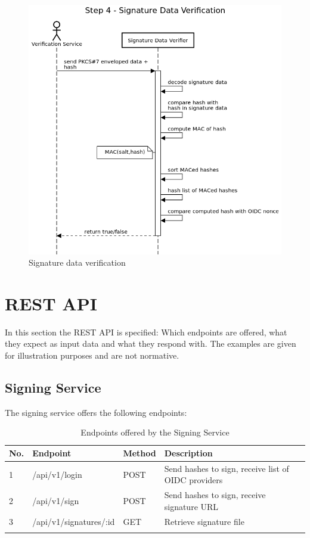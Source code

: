 \begin{figure}
    \begin{center}
        \includegraphics[scale=0.5]{images/protocol_verification_step4_signature_data.png}
        \caption{Signature data verification}
        \label{fig:signaturedataverification}
    \end{center}
\end{figure}

\section{REST API}\label{sec:rest-api}
In this section the \gls{REST} \gls{API} is specified:
Which endpoints are offered, what they expect as input data and what they respond with.
The examples are given for illustration purposes and are not normative.

\subsection{Signing Service}
The signing service offers the following endpoints:

\begin{longtable}{|l|l|l|l|}
    \hline
    \textbf{No.} & \textbf{Endpoint} & \textbf{Method} & \textbf{Description} \\ \hline
    1 & /api/v1/login & POST & Send hashes to sign, receive list of OIDC providers \\ \hline
    2 & /api/v1/sign & POST & Send hashes to sign, receive signature URL \\ \hline
    3 & /api/v1/signatures/:id & GET & Retrieve signature file \\ \hline
    \caption{Endpoints offered by the Signing Service}
\end{longtable}

